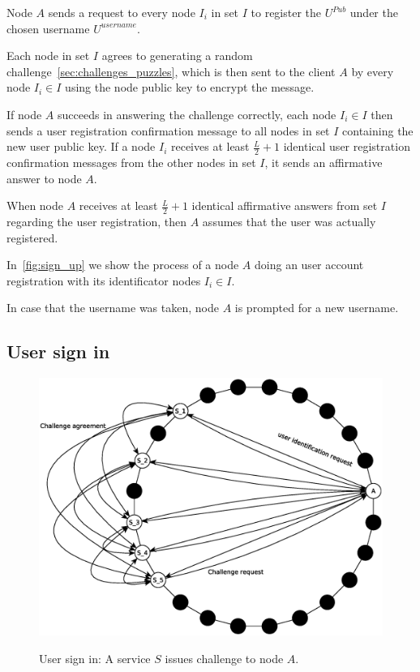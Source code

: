 Node $A$ sends a request to every node $I_i$ in set $I$ to register the
$U^{Pub}$ under the chosen  username  $U^{username}$.


Each node in set $I$ agrees to generating a random challenge~\ref{sec:challenges_puzzles}, which is then sent to the
client $A$ by every node $I_i \in I$ using the node public key to encrypt the
message.

If node $A$ succeeds in answering the challenge correctly, each node $I_i \in I$ then sends a user registration confirmation message to all nodes
in set $I$ containing the new user public key. If a node $I_i$ receives at
least $\frac{L}{2} + 1$ identical user registration confirmation messages from
the other nodes in set $I$, it sends an affirmative answer to node $A$.

When node $A$ receives at least $\frac{L}{2} + 1$ identical affirmative answers
from set $I$ regarding the user registration, then $A$ assumes that the user was
actually registered.

In~\ref{fig:sign_up} we show the process of a node $A$ doing an user account
registration with its identificator nodes $I_i \in I$.

In case that the username was taken,
node $A$ is prompted for a new username.



\subsection{User sign in}
\begin{figure}[!htb]
\centering
\includegraphics[width=14cm]{../img/sign_in}\\
\caption{User sign in: A service $S$ issues challenge to node $A$.}
\label{fig:sign_in}
\end{figure}

